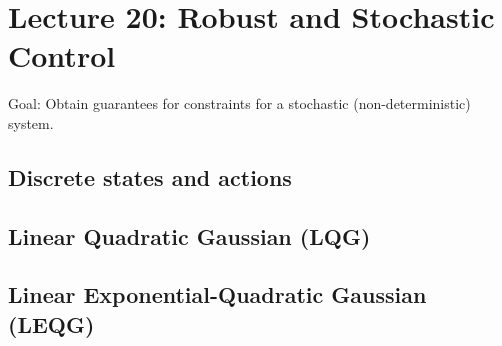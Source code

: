 \chapter{Lecture 20: Robust and Stochastic Control}
Goal: Obtain guarantees for constraints for a stochastic (non-deterministic) system.
\section{Discrete states and actions}
\section{Linear Quadratic Gaussian (LQG)}
\section{Linear Exponential-Quadratic Gaussian (LEQG)}